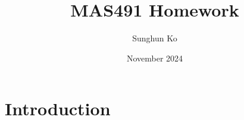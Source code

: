 \documentclass{article}
\title{MAS491 Homework}
\author{Sunghun Ko}
\date{November 2024}
\begin{document}
\maketitle

\section{Introduction}
\end{document}
